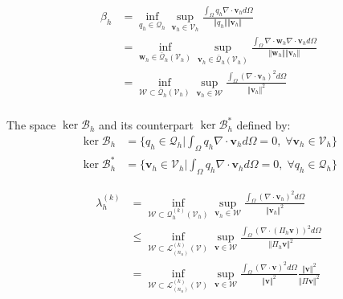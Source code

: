\begin{equation}
\begin{split}
\beta_h &= \inf_{q_h \in \mathcal Q_h} \sup_{\boldsymbol v_h \in \mathcal V_h} \frac{\int_{\Omega} q_h \nabla \cdot \boldsymbol v_h d\Omega}{\Vert q_h \Vert \Vert \boldsymbol v_h \Vert} \\
    &= \inf_{\boldsymbol w_h \in \bar{\mathcal Q}_h(\mathcal V_h)} \sup_{\boldsymbol v_h \in \bar{\mathcal Q}_h(\mathcal V_h)} \frac{\int_{\Omega} \nabla \cdot \boldsymbol w_h \nabla \cdot \boldsymbol v_h d\Omega}{\Vert \boldsymbol w_h \Vert \Vert \boldsymbol v_h \Vert} \\ 
    &= \inf_{\mathcal W \subset \bar{\mathcal Q}_h(\mathcal V_h)} \sup_{\boldsymbol v_h \in \mathcal W} \frac{\int_{\Omega} (\nabla \cdot \boldsymbol v_h)^2 d\Omega}{\Vert \boldsymbol v_h \Vert^2} \\
\end{split}
\end{equation}

The space $\ker \mathcal B_h$ and its counterpart $\ker \mathcal B_h^*$ defined by:
\begin{align}
    \ker \mathcal B_h &= \{q_h \in \mathcal Q_h \vert \int_{\Omega} q_h \nabla \cdot \boldsymbol v_h d\Omega = 0,\; \forall \boldsymbol v_h \in \mathcal V_h\} \\
    \ker \mathcal B_h^* &= \{\boldsymbol v_h \in \mathcal V_h \vert \int_{\Omega} q_h \nabla \cdot \boldsymbol v_h d\Omega = 0,\; \forall q_h \in \mathcal Q_h\}
\end{align} \par


\begin{equation}
\begin{split}
    \lambda^{(k)}_h &= \inf_{\mathcal W \subset \mathcal Q_h^{(k)}(\mathcal V_h)} \sup_{\boldsymbol v_h \in \mathcal W} \frac{\int_{\Omega} (\nabla \cdot \boldsymbol v_h)^2 d\Omega}{\Vert \boldsymbol v_h \Vert^2} \\
    &\le \inf_{\mathcal W \subset \mathcal L^{(k)}_{(n_u)}(\mathcal V)} \sup_{\boldsymbol v \in \mathcal W} \frac{\int_{\Omega} (\nabla \cdot (\Pi_h \boldsymbol v))^2 d\Omega}{\Vert \Pi_h \boldsymbol v \Vert^2} \\
    &= \inf_{\mathcal W \subset \mathcal L^{(k)}_{(n_u)}(\mathcal V)} \sup_{\boldsymbol v \in \mathcal W} \frac{\int_{\Omega} (\nabla \cdot \boldsymbol v)^2 d\Omega}{\Vert \boldsymbol v \Vert^2}
    \frac{\Vert \boldsymbol v \Vert^2}{\Vert \Pi \boldsymbol v \Vert^2}\\
\end{split}
\end{equation}

